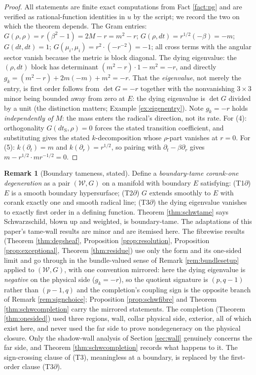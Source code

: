 \documentclass[11pt]{article}
\theoremstyle{definition}
\newtheorem{remark}[theorem]{Remark}
\newcommand{\shW}{\mathcal{W}}
\newcommand{\dtS}{dt_{\mathrm{S}}}
\newcommand{\dtPG}{dt}
\begin{document}
\begin{proof}
All statements are finite exact computations from Fact \ref{fact:pg} and are verified as rational-function identities in $u$ by the script; we record the two on which the theorem depends. The Gram entries: $G(\rho,\rho) = r\,(\beta^2 - 1) = 2M - r = m^2 - r$; $G(\rho, \dtPG) = r^{1/2}(-\beta) = -m$; $G(\dtPG,\dtPG) = 1$; $G(\mu_i,\mu_i) = r^2 \cdot (-r^{-2}) = -1$; all cross terms with the angular sector vanish because the metric is block diagonal. The dying eigenvalue: the $(\rho, \dtPG)$ block has determinant $(m^2 - r)\cdot 1 - m^2 = -r$, and directly $g_k = (m^2 - r) + 2m(-m) + m^2 = -r$. That the \emph{eigenvalue}, not merely the entry, is first order follows from $\det G = -r$ together with the nonvanishing $3 \times 3$ minor being bounded away from zero at $E$: the dying eigenvalue is $\det G$ divided by a unit (the distinction matters; Example \ref{ex:eigenentry}). Note $g_k = -r$ holds \emph{independently of $M$}: the mass enters the radical's direction, not its rate. For (4): orthogonality $G(\dtS, \rho) = 0$ forces the stated transition coefficient, and substituting gives the stated $k$-decomposition whose $\rho$-part vanishes at $r = 0$. For (5): $k(\partial_t) = m$ and $k(\partial_r) = r^{1/2}$, so pairing with $\partial_t - \beta \partial_r$ gives $m - r^{1/2}\cdot m r^{-1/2} = 0$.
\end{proof}

\begin{remark}[Boundary tameness, stated]\label{rem:boundarytame}
Define a \emph{boundary-tame corank-one degeneration} as a pair $(\shW, G)$ on a manifold with boundary $E$ satisfying: (T1$\partial$) $E$ is a smooth boundary hypersurface; (T2$\partial$) $G$ extends smoothly to $E$ with corank exactly one and smooth radical line; (T3$\partial$) the dying eigenvalue vanishes to exactly first order in a defining function. Theorem \ref{thm:schwtame} says Schwarzschild, blown up and weighted, is boundary-tame. The adaptations of this paper's tame-wall results are minor and are itemised here. The fibrewise results (Theorem \ref{thm:degsheaf}, Proposition \ref{prop:resolution}, Proposition \ref{prop:exceptional}, Theorem \ref{thm:residue}) use only the form and its one-sided limit and go through in the bundle-valued sense of Remark \ref{rem:bundlesetup} applied to $(\shW, G)$, with one convention mirrored: here the dying eigenvalue is \emph{negative} on the physical side ($g_k = -r$), so the quotient signature is $(p, q{-}1)$ rather than $(p{-}1, q)$ and the completion's coupling sign is the opposite branch of Remark \ref{rem:signchoice}; Proposition \ref{prop:schwfibre} and Theorem \ref{thm:schwcompletion} carry the mirrored statements. The completion (Theorem \ref{thm:onesided}) used three regions, wall, collar physical side, exterior, all of which exist here, and never used the far side to prove nondegeneracy on the physical closure. Only the shadow-wall analysis of Section \ref{sec:wall} genuinely concerns the far side, and Theorem \ref{thm:schwcompletion} records what happens to it. The sign-crossing clause of (T3), meaningless at a boundary, is replaced by the first-order clause (T3$\partial$).
\end{remark}
\end{document}
